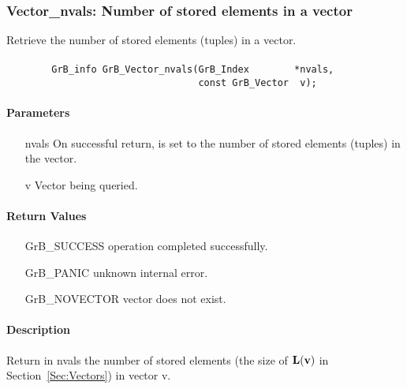 \subsubsection{{\sf Vector\_nvals}: Number of stored elements in a vector}

Retrieve the number of stored elements (tuples) in a vector.

\paragraph{\syntax}

\begin{verbatim}
        GrB_info GrB_Vector_nvals(GrB_Index        *nvals,
                                  const GrB_Vector  v);
\end{verbatim}

\paragraph{Parameters}

\begin{itemize}[leftmargin=1.1in]
    \item[{\sf nvals}] On successful return, is set to the number of stored elements (tuples)
    in the vector.
    \item[{\sf v}] Vector being queried.
\end{itemize}


\paragraph{Return Values}

\begin{itemize}[leftmargin=2.1in]
\item[{\sf GrB\_SUCCESS}]   operation completed successfully.
\item[{\sf GrB\_PANIC}]     unknown internal error.
\item[{\sf GrB\_NOVECTOR}]  vector does not exist.
\end{itemize}

\paragraph{Description}

Return in {\sf nvals} the number of stored elements (the size of $\bold{L}({\bf v})$
in Section~\ref{Sec:Vectors}) in vector {\sf v}.



